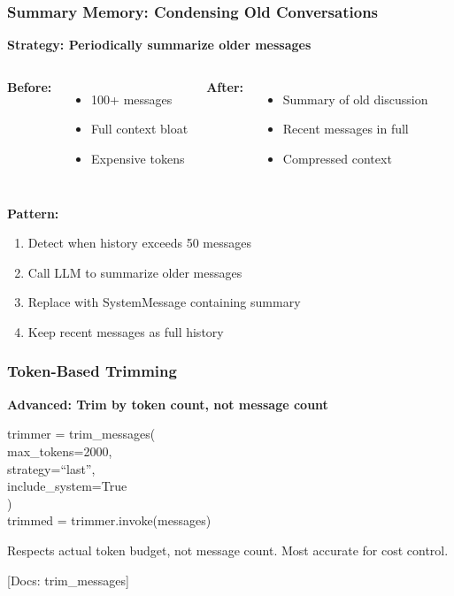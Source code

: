 \documentclass[aspectratio=169,11pt]{beamer}
\newcommand{\docref}[1]{{\scriptsize\color{docgray}[Docs: #1]}}
\begin{document}
\begin{frame}
  \frametitle{Summary Memory: Condensing Old Conversations}
  \textbf{Strategy: Periodically summarize older messages}
  \vspace{0.6em}
  \begin{columns}
    \textbf{Before:}
    \begin{itemize}
      \item 100+ messages
      \item Full context bloat
      \item Expensive tokens
    \end{itemize}

    \textbf{After:}
    \begin{itemize}
      \item Summary of old discussion
      \item Recent messages in full
      \item Compressed context
    \end{itemize}
  \end{columns}
  \vspace{0.8em}
  \textbf{Pattern:}
  \begin{enumerate}
    \item Detect when history exceeds 50 messages
    \item Call LLM to summarize older messages
    \item Replace with SystemMessage containing summary
    \item Keep recent messages as full history
  \end{enumerate}
\end{frame}

\begin{frame}
  \frametitle{Token-Based Trimming}
  \textbf{Advanced: Trim by token count, not message count}
  \vspace{0.6em}
  \begin{codebox}
    \ttfamily\small
    trimmer = trim\_messages( \\
    \hspace{2em} max\_tokens=2000, \\
    \hspace{2em} strategy=``last'', \\
    \hspace{2em} include\_system=True \\
    ) \\
    trimmed = trimmer.invoke(messages)
  \end{codebox}
  \vspace{0.6em}
  \begin{tipbox}[Advantage]
    Respects actual token budget, not message count. Most accurate for cost control.
  \end{tipbox}
  \docref{trim\_messages}
\end{frame}
\end{document}

